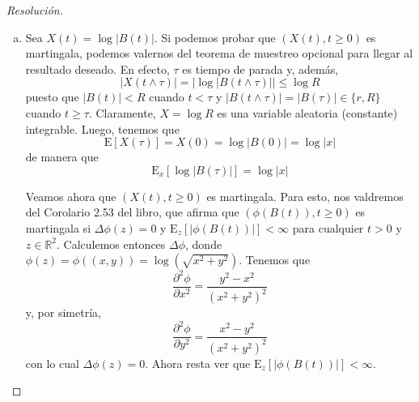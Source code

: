 \documentclass[a4paper,11pt]{article}
\newcommand{\abs}[1]{\ensuremath{\left\lvert #1 \right\rvert}}
\newcommand{\Exp}[1]{\ensuremath{\textrm{E}\left[#1\right]}}
\newcommand{\Expx}[2]{\ensuremath{\textrm{E}_{#1}\left[#2\right]}}
\begin{document}
\begin{proof}[Resoluci\'on]
$ $ 
\begin{enumerate}[a.]
    \item Sea $X(t) = \log \abs{B(t)}$. Si podemos probar que $(X(t), t \geq 0)$ es
    martingala, podemos valernos del teorema de muestreo opcional para llegar al
    resultado deseado. En efecto, $\tau$ es tiempo de parada y, además,
       $$\abs{X(t \wedge \tau)} = \abs{\log \abs{B(t \wedge \tau)}} \leq \log R$$
    puesto que $\abs{B(t)} < R$  cuando $t < \tau$ y
    $\abs{B(t \wedge \tau)} = \abs{B(\tau)} \in \{r, R\}$ cuando
    $t \geq \tau$. Claramente, $X = \log R$ es una variable aleatoria (constante)
    integrable. Luego, tenemos que
    $$\Exp{X(\tau)} = X(0) = \log \abs{B(0)} = \log \abs{x}$$
    de manera que 
    $$\Expx{x}{\log \abs{B(\tau)}} = \log \abs{x}$$

    Veamos ahora que $(X(t), t \geq 0)$ es martingala. Para esto, nos valdremos del
    Corolario 2.53 del libro, que afirma que $(\phi(B(t)), t \geq 0)$ es martingala
    si $\Delta \phi(z) = 0$ y $\Expx{z}{\abs{\phi(B(t))}} < \infty$
    para cualquier $t > 0$ y $z \in \mathbb{R}^2$. Calculemos entonces
    $\Delta \phi$, donde $\phi(z) = \phi((x,y)) = \log(\sqrt{x^2 + y^2})$. 
    Tenemos que 
    $$\frac{\partial^2 \phi}{\partial x^2} = \frac{y^2 - x^2}{(x^2 + y^2)^2}$$
    y, por simetría,
    $$\frac{\partial^2 \phi}{\partial y^2} = \frac{x^2 - y^2}{(x^2 + y^2)^2}$$
    con lo cual $\Delta \phi(z) = 0$. Ahora resta ver que
    $\Expx{z}{\abs{\phi(B(t))}} < \infty$.
    


\end{enumerate}
\end{proof}
\end{document}
